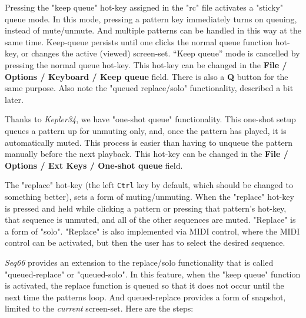    Pressing the "keep queue" hot-key
   assigned in the "rc" file activates a "sticky" queue mode.
   In this mode, pressing a pattern key immediately turns on queuing, instead
   of mute/unmute.  And multiple patterns can be handled in this way at the
   same time.
   Keep-queue persists until one clicks the normal queue function hot-key,
   or changes the active (viewed) screen-set. 
   “Keep queue” mode is cancelled by pressing the normal queue hot-key.
   This hot-key can be changed in the
   \textbf{File / Options / Keyboard / Keep queue} field.
   There is also a \textbf{Q} button for the same purpose.
   Also note the "queued replace/solo" functionality, described a bit later.

   Thanks to \textsl{Kepler34}, we have "one-shot queue"
   functionality.  This one-shot setup queues a pattern up for unmuting only,
   and, once the pattern has played, it is automatically muted.  This process
   is easier than having to unqueue the pattern manually before the next
   playback.
   This hot-key can be changed in the
   \textbf{File / Options / Ext Keys / One-shot queue} field.

   The "replace" hot-key (the left \texttt{Ctrl} key by default, which 
   should be changed to something better), 
   sets a form of muting/unmuting.  When the "replace" hot-key is
   pressed and held while clicking a pattern or pressing that pattern's
   hot-key, that sequence is unmuted, and all of the other sequences are muted.
   "Replace" is a form of "solo".
   "Replace" is also implemented via MIDI control,
   where the MIDI control can be activated, but then the user has to select
   the desired sequence.  

   \textsl{Seq66} provides an extension to the replace/solo functionality
   that is called "queued-replace" or "queued-solo".  In this feature, when
   the "keep queue" function is activated, the replace function is queued so
   that it does not occur until the next time the patterns loop.
   And queued-replace provides a form of snapshot, limited to the
   \textsl{current} screen-set.
   Here are the steps:

